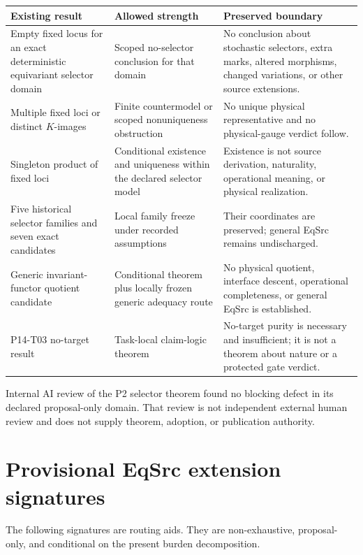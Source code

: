 \documentclass[11pt]{article}
\begin{document}
\begin{longtable}{>{\raggedright\arraybackslash}p{}
                  >{\raggedright\arraybackslash}p{}
                  >{\raggedright\arraybackslash}p{}}
\toprule
Existing result & Allowed strength & Preserved boundary \\
\midrule
\endhead
Empty fixed locus for an exact deterministic equivariant selector domain &
Scoped no-selector conclusion for that domain &
No conclusion about stochastic selectors, extra marks, altered morphisms,
changed variations, or other source extensions. \\
Multiple fixed loci or distinct $K$-images &
Finite countermodel or scoped nonuniqueness obstruction &
No unique physical representative and no physical-gauge verdict follow. \\
Singleton product of fixed loci &
Conditional existence and uniqueness within the declared selector model &
Existence is not source derivation, naturality, operational meaning, or
physical realization. \\
Five historical selector families and seven exact candidates &
Local family freeze under recorded assumptions &
Their coordinates are preserved; general EqSrc remains undischarged. \\
Generic invariant-functor quotient candidate &
Conditional theorem plus locally frozen generic adequacy route &
No physical quotient, interface descent, operational completeness, or
general EqSrc is established. \\
P14-T03 no-target result &
Task-local claim-logic theorem &
No-target purity is necessary and insufficient; it is not a theorem about
nature or a protected gate verdict. \\
\bottomrule
\end{longtable}

Internal AI review of the P2 selector theorem found no blocking defect in its
declared proposal-only domain.  That review is not independent external human
review and does not supply theorem, adoption, or publication authority.

\section{Provisional EqSrc extension signatures}

The following signatures are routing aids.  They are non-exhaustive,
proposal-only, and conditional on the present burden decomposition.
\end{document}
